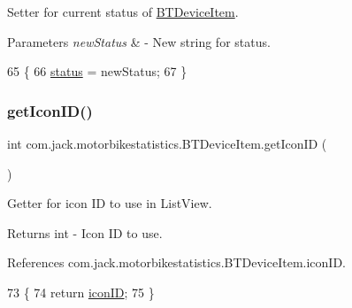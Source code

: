 Setter for current status of \hyperlink{classcom_1_1jack_1_1motorbikestatistics_1_1_b_t_device_item}{B\+T\+Device\+Item}. 


\begin{DoxyParams}{Parameters}
{\em new\+Status} & -\/ New string for status. \\
\hline
\end{DoxyParams}

\begin{DoxyCode}
65                                             \{
66         \hyperlink{classcom_1_1jack_1_1motorbikestatistics_1_1_b_t_device_item_ae7a8756973644c5719d5faddf3fa7946}{status} = newStatus;
67     \}
\end{DoxyCode}
\mbox{\label{classcom_1_1jack_1_1motorbikestatistics_1_1_b_t_device_item_a9e16b980dbddfdb9347ffa6237b78de5}} 
\subsubsection{\texorpdfstring{get\+Icon\+I\+D()}{getIconID()}}
{\footnotesize\ttfamily int com.\+jack.\+motorbikestatistics.\+B\+T\+Device\+Item.\+get\+Icon\+ID (\begin{DoxyParamCaption}{ }\end{DoxyParamCaption})\hspace{0.3cm}{\ttfamily [inline]}}



Getter for icon ID to use in List\+View. 

\begin{DoxyReturn}{Returns}
int -\/ Icon ID to use. 
\end{DoxyReturn}


References com.\+jack.\+motorbikestatistics.\+B\+T\+Device\+Item.\+icon\+ID.


\begin{DoxyCode}
73                            \{
74         \textcolor{keywordflow}{return} \hyperlink{classcom_1_1jack_1_1motorbikestatistics_1_1_b_t_device_item_a77f7a3c228f87fa5e946fe77b310f805}{iconID};
75     \}
\end{DoxyCode}
\mbox{\label{classcom_1_1jack_1_1motorbikestatistics_1_1_b_t_device_item_a40eb2a1f46700690d2327bf37bc5ed0e}} 
